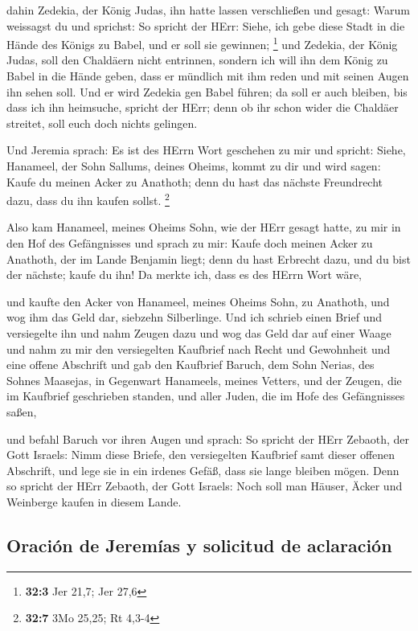  dahin Zedekia, der König Judas, ihn hatte lassen
verschließen und gesagt: Warum weissagst du und sprichst: So spricht der
HErr: Siehe, ich gebe diese Stadt in die Hände des Königs zu Babel, und
er soll sie gewinnen; \footnote{\textbf{32:3} Jer 21,7; Jer 27,6}
 und Zedekia, der König Judas, soll den Chaldäern nicht
entrinnen, sondern ich will ihn dem König zu Babel in die Hände geben,
dass er mündlich mit ihm reden und mit seinen Augen ihn sehen soll.
 Und er wird Zedekia gen Babel führen; da soll er auch
bleiben, bis dass ich ihn heimsuche, spricht der HErr; denn ob ihr schon
wider die Chaldäer streitet, soll euch doch nichts gelingen.

 Und Jeremia sprach: Es ist des HErrn Wort geschehen zu
mir und spricht:  Siehe, Hanameel, der Sohn Sallums,
deines Oheims, kommt zu dir und wird sagen: Kaufe du meinen Acker zu
Anathoth; denn du hast das nächste Freundrecht dazu, dass du ihn kaufen
sollst. \footnote{\textbf{32:7} 3Mo 25,25; Rt 4,3-4}

 Also kam Hanameel, meines Oheims Sohn, wie der HErr
gesagt hatte, zu mir in den Hof des Gefängnisses und sprach zu mir:
Kaufe doch meinen Acker zu Anathoth, der im Lande Benjamin liegt; denn
du hast Erbrecht dazu, und du bist der nächste; kaufe du ihn! Da merkte
ich, dass es des HErrn Wort wäre,

 und kaufte den Acker von Hanameel, meines Oheims Sohn, zu
Anathoth, und wog ihm das Geld dar, siebzehn Silberlinge.
 Und ich schrieb einen Brief und versiegelte ihn und nahm
Zeugen dazu und wog das Geld dar auf einer Waage  und
nahm zu mir den versiegelten Kaufbrief nach Recht und Gewohnheit und
eine offene Abschrift  und gab den Kaufbrief Baruch, dem
Sohn Nerias, des Sohnes Maasejas, in Gegenwart Hanameels, meines
Vetters, und der Zeugen, die im Kaufbrief geschrieben standen, und aller
Juden, die im Hofe des Gefängnisses saßen,

 und befahl Baruch vor ihren Augen und sprach:
 So spricht der HErr Zebaoth, der Gott Israels: Nimm
diese Briefe, den versiegelten Kaufbrief samt dieser offenen Abschrift,
und lege sie in ein irdenes Gefäß, dass sie lange bleiben mögen.
 Denn so spricht der HErr Zebaoth, der Gott Israels: Noch
soll man Häuser, Äcker und Weinberge kaufen in diesem Lande.

\hypertarget{oraciuxf3n-de-jeremuxedas-y-solicitud-de-aclaraciuxf3n}{%
\subsection{Oración de Jeremías y solicitud de
aclaración}\label{oraciuxf3n-de-jeremuxedas-y-solicitud-de-aclaraciuxf3n}}


